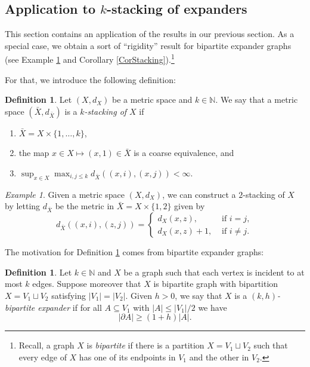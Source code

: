 \documentclass[11pt]{amsart}
\newcommand{\N}{\mathbb{N}}
\numberwithin{equation}{section}
\theoremstyle{definition}
\newtheorem{definition}[theorem]{Definition}
\theoremstyle{remark}
\newtheorem{example}[theorem]{Example}
\numberwithin{equation}{section}
\begin{document}
\subsection{Application to $k$-stacking of expanders}

This section contains an application of the results in our previous section. As a special case, we obtain a sort of ``rigidity'' result for bipartite expander graphs (see Example \ref{bip ex} and Corollary \ref{CorStacking}).\footnote{Recall, a graph $X$ is \emph{bipartite} if there is a partition $X=V_1\sqcup V_2$ such that every edge of $X$ has one of its endpoints in $V_1$ and the other in $V_2$.} 

For that, we introduce the following definition: 

\begin{definition}\label{DefiStacking}
 Let $(X,d_X)$ be a metric space and $k\in\N$. We say that a metric space $(\bar X,d_{\bar X})$ is a \emph{$k$-stacking of $X$} if 
 \begin{enumerate}
 \item $\bar X=X\times \{1,\ldots, k\}$,
 \item the map $x\in X \mapsto (x,1)\in {\bar X}$ is a coarse equivalence, and 
 \item $\sup_{x\in X}\max_{i,j\leq k}d_{\bar X}((x,i),(x,j))<\infty$.
 \end{enumerate} 
\end{definition}

\begin{example}\label{bip ex}
 Given a metric space $(X,d_X)$, we can construct a $2$-stacking of $X$ by letting $d_{\bar X}$ be the metric in $\bar X=X\times \{1,2\}$ given by 
 \[d_{\bar X}((x,i),(z,j))=\left\{\begin{array}{ll}
 d_X(x,z), & \text{ if } i=j, \\
 d_X(x,z)+1, & \text{ if } i\neq j.
 \end{array}\right.\]
\end{example}

The motivation for Definition \ref{DefiStacking} comes from bipartite expander graphs: 

\begin{definition}
Let $k\in\N$ and $X$ be a graph such that each vertex is incident to at most $k$ edges. Suppose moreover that $X$ is bipartite graph with bipartition $X=V_1\sqcup V_2$ satisfying $|V_1|=|V_2|$. Given $h>0$, we say that $X$ is a \emph{$(k,h)$-bipartite expander} if for all $A\subseteq V_1$ with $|A|\leq |V_1|/2$ we have 
\[
|\partial A|\geq (1+h)|A|.
\]
\end{definition}
\end{document}
